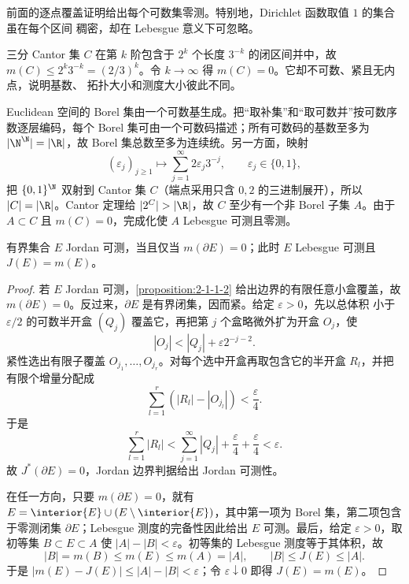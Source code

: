 \begin{example}[可数集零测度]\label{ex:2-1-3-1}
前面的逐点覆盖证明给出每个可数集零测。特别地，Dirichlet 函数取值 $1$ 的集合虽在每个区间
稠密，却在 Lebesgue 意义下可忽略。
\end{example}

\begin{example}[Cantor 集]\label{ex:2-1-3-2}
三分 Cantor 集 $C$ 在第 $k$ 阶包含于 $2^k$ 个长度 $3^{-k}$ 的闭区间并中，故
$m(C)\le2^k3^{-k}=(2/3)^k$。令 $k\to\infty$ 得 $m(C)=0$。它却不可数、紧且无内点，说明基数、
拓扑大小和测度大小彼此不同。
\end{example}

\begin{example}[完成化确实增加集合]\label{ex:2-1-3-3}
Euclidean 空间的 Borel 集由一个可数基生成。把“取补集”和“取可数并”按可数序数逐层编码，每个
Borel 集可由一个可数码描述；所有可数码的基数至多为
$|\N^\N|=|\R|$，故 Borel 集总数至多为连续统。另一方面，映射
\[
 (\varepsilon_j)_{j\ge1}\longmapsto
 \sum_{j=1}^{\infty}2\varepsilon_j3^{-j},
 \qquad \varepsilon_j\in\{0,1\},
\]
把 $\{0,1\}^{\N}$ 双射到 Cantor 集 $C$（端点采用只含 $0,2$ 的三进制展开），所以
$|C|=|\R|$。Cantor 定理给 $|2^C|>|\R|$，故 $C$ 至少有一个非 Borel 子集 $A$。由于
$A\subset C$ 且
$m(C)=0$，完成化使 $A$ Lebesgue 可测且零测。
\end{example}

\begingroup
\raggedbottom
\begin{proposition}\label{proposition:2-1-3-4}
有界集合 $E$ Jordan 可测，当且仅当 $m(\partial E)=0$；此时 $E$ Lebesgue 可测且
$J(E)=m(E)$。
\end{proposition}

\begin{proof}
若 $E$ Jordan 可测，\cref{proposition:2-1-1-2} 给出边界的有限任意小盒覆盖，故
$m(\partial E)=0$。反过来，$\partial E$ 是有界闭集，因而紧。给定 $\varepsilon>0$，先以总体积
小于 $\varepsilon/2$ 的可数半开盒 $(Q_j)$ 覆盖它，再把第 $j$ 个盒略微外扩为开盒 $O_j$，使
\[
 |O_j|<|Q_j|+\varepsilon2^{-j-2}.
\]
紧性选出有限子覆盖 $O_{j_1},\dots,O_{j_r}$。对每个选中开盒再取包含它的半开盒 $R_l$，并把
有限个增量分配成
\[
 \sum_{l=1}^r(|R_l|-|O_{j_l}|)<\frac{\varepsilon}{4}.
\]
于是
\[
 \sum_{l=1}^r|R_l|
 <\sum_{j=1}^{\infty}|Q_j|+\frac{\varepsilon}{4}+\frac{\varepsilon}{4}
 <\varepsilon.
\]
故 $J^*(\partial E)=0$，Jordan 边界判据给出
Jordan 可测性。

在任一方向，只要 $m(\partial E)=0$，就有
$E=\interior{E}\cup(E\setminus\interior{E})$，其中第一项为 Borel 集，第二项包含于零测闭集
$\partial E$；Lebesgue 测度的完备性因此给出 $E$ 可测。最后，给定 $\varepsilon>0$，取初等集
$B\subset E\subset A$ 使 $|A|-|B|<\varepsilon$。初等集的 Lebesgue 测度等于其体积，故
\[
 |B|=m(B)\le m(E)\le m(A)=|A|,
 \qquad
 |B|\le J(E)\le |A|.
\]
于是 $|m(E)-J(E)|\le |A|-|B|<\varepsilon$；令 $\varepsilon\downarrow0$ 即得
$J(E)=m(E)$。
\end{proof}

